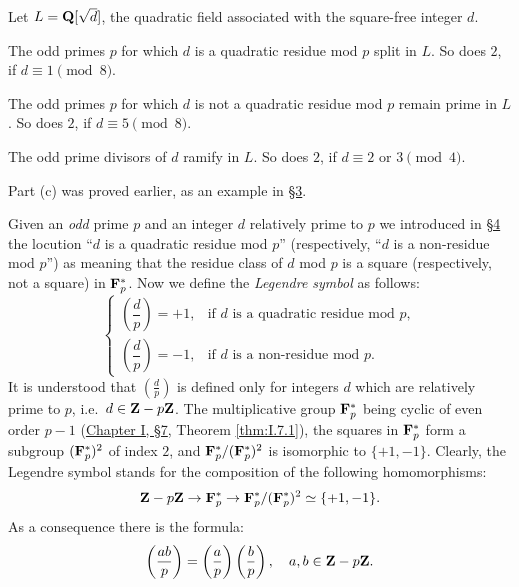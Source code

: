 \begin{proposition}
\label{prop:V.4.1}
Let $L=\mathbf{Q}[\sqrt{d}]$, the quadratic field associated with the square-free
integer $d$.
\begin{alist}
\item The odd primes $p$ for which $d$ is a quadratic residue mod $p$ split
in $L$. So does $2$, if $d\equiv1\pmod8$.
\item The odd primes $p$ for which $d$ is not a quadratic residue mod $p$
remain prime in $L$. So does $2$, if $d\equiv5\pmod8$.
\item The odd prime divisors of $d$ ramify in $L$. So does $2$, if
$d\equiv2$ or $3\pmod4$.
\end{alist}
\end{proposition}

Part (c) was proved earlier, as an example in \hyperref[sec:5.3]{§3}.


Given an \emph{odd} prime $p$ and an integer $d$ relatively prime to $p$ we
introduced in \hyperref[sec:5.4]{§4} the locution ``$d$ is a quadratic residue mod $p$''
(respectively, ``$d$ is a non-residue mod $p$'') as meaning that the residue
class of $d$ mod $p$ is a square (respectively, not a square) in $\mathbf{F}_{p}^{*}$.
Now we define the \emph{Legendre symbol} as follows:
\begin{equation}
\begin{cases}
\left(\dfrac{d}{p}\right)=+1, &
\text{if } d \text{ is a quadratic residue mod } p,\\[6pt]
\left(\dfrac{d}{p}\right)=-1, &
\text{if } d \text{ is a non-residue mod } p.
\end{cases}
\label{eq:V.5.1}
\end{equation}
It is understood that $\left(\frac{d}{p}\right)$ is defined only for integers
$d$ which are relatively prime to $p$, i.e.\ $d\in\mathbf{Z}-p\mathbf{Z}$. The
multiplicative group $\mathbf{F}_{p}^{*}$ being cyclic of even order $p-1$
(\hyperref[sec:1.7]{Chapter I, §7}, Theorem \ref{thm:I.7.1}), the squares in $\mathbf{F}_{p}^{*}$ form a
subgroup $(\mathbf{F}_{p}^{*})^{2}$ of index $2$, and
$\mathbf{F}_{p}^{*}/(\mathbf{F}_{p}^{*})^{2}$ is isomorphic to $\{+1,-1\}$. Clearly, the
Legendre symbol stands for the composition of the following homomorphisms:
\[
\mathbf{Z}-p\mathbf{Z}\to\mathbf{F}_{p}^{*}\to\mathbf{F}_{p}^{*}/(\mathbf{F}_{p}^{*})^{2}\simeq\{+1,-1\}.
\]
As a consequence there is the formula:
\begin{equation}
\left(\frac{ab}{p}\right)=\left(\frac{a}{p}\right)\left(\frac{b}{p}\right),
\quad a,b\in\mathbf{Z}-p\mathbf{Z}.
\label{eq:V.5.2}
\end{equation}

